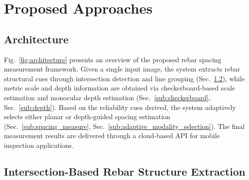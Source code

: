 \documentclass{article}
\begin{document}

\vspace{-0.3cm}


\section{Proposed Approaches}
\label{sec:method}
\vspace{-0.3cm}

\subsection{Architecture}
\label{sub:architecture}


Fig.~\ref{fig:architecture} presents an overview of the proposed rebar spacing measurement framework. Given a single input image, the system extracts rebar structural cues through intersection detection and line grouping (Sec.~\ref{sub:intersection_detection}), while metric scale and depth information are obtained via checkerboard-based scale estimation and monocular depth estimation (Sec.~\ref{sub:checkerboard}, Sec.~\ref{sub:depth}). Based on the reliability cues derived, the system adaptively selects either planar or depth-guided spacing estimation (Sec.~\ref{sub:spacing_measure}, Sec.~\ref{sub:adaptive_modality_selection}). The final measurement results are delivered through a cloud-based API for mobile inspection applications.


\vspace{-0.3cm}

\subsection{Intersection-Based Rebar Structure Extraction}
\label{sub:intersection_detection}
\end{document}
